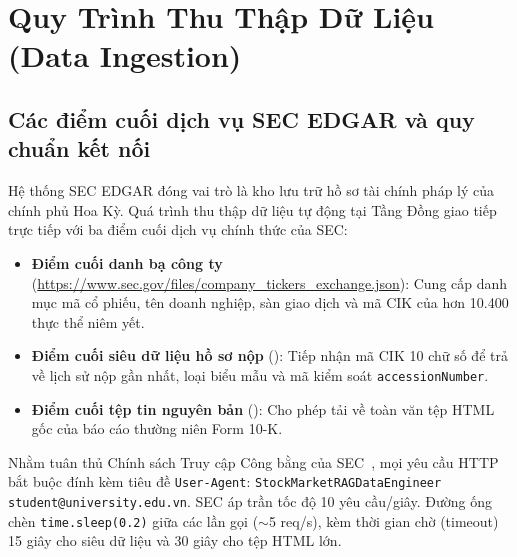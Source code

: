 \section{Quy Trình Thu Thập Dữ Liệu (Data Ingestion)}

\subsection{Các điểm cuối dịch vụ SEC EDGAR và quy chuẩn kết nối}
Hệ thống SEC EDGAR đóng vai trò là kho lưu trữ hồ sơ tài chính pháp lý của chính phủ Hoa Kỳ. Quá trình thu thập dữ liệu tự động tại Tầng Đồng giao tiếp trực tiếp với ba điểm cuối dịch vụ chính thức của SEC:
\begin{itemize}
    \item \textbf{Điểm cuối danh bạ công ty} (\url{https://www.sec.gov/files/company_tickers_exchange.json}): Cung cấp danh mục mã cổ phiếu, tên doanh nghiệp, sàn giao dịch và mã CIK của hơn 10.400 thực thể niêm yết.
    \item \textbf{Điểm cuối siêu dữ liệu hồ sơ nộp} (): Tiếp nhận mã CIK 10 chữ số để trả về lịch sử nộp gần nhất, loại biểu mẫu và mã kiểm soát \texttt{accessionNumber}.
    \item \textbf{Điểm cuối tệp tin nguyên bản} (): Cho phép tải về toàn văn tệp HTML gốc của báo cáo thường niên Form 10-K.
\end{itemize}

Nhằm tuân thủ Chính sách Truy cập Công bằng của SEC~\cite{sec2024edgar}, mọi yêu cầu HTTP bắt buộc đính kèm tiêu đề \texttt{User-Agent}: \texttt{StockMarketRAGDataEngineer student@university.edu.vn}. SEC áp trần tốc độ 10 yêu cầu/giây. Đường ống chèn \texttt{time.sleep(0.2)} giữa các lần gọi ($\sim$5 req/s), kèm thời gian chờ (timeout) 15 giây cho siêu dữ liệu và 30 giây cho tệp HTML lớn.

